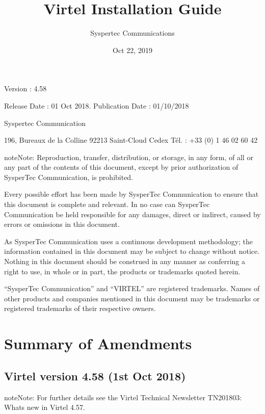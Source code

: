 \documentclass[letterpaper,10pt,english]{sphinxmanual}
\title{Virtel Installation Guide}
\date{Oct 22, 2019}
\author{Syspertec Communications}
\begin{document}
\pagestyle{empty}
\sphinxmaketitle
\pagestyle{plain}
\sphinxtableofcontents
\pagestyle{normal}
\label{\detokenize{Installation_Guide::doc}}




Version : 4.58

Release Date : 01 Oct 2018. Publication Date : 01/10/2018

Syspertec Communication

196, Bureaux de la Colline 92213 Saint-Cloud Cedex Tél. : +33 (0) 1 46 02 60 42


\begin{sphinxadmonition}{note}{Note:}
Reproduction, transfer, distribution, or storage, in any form, of all or any part of
the contents of this document, except by prior authorization of SysperTec
Communication, is prohibited.

Every possible effort has been made by SysperTec Communication to ensure that this document
is complete and relevant. In no case can SysperTec Communication be held responsible for
any damages, direct or indirect, caused by errors or omissions in this document.

As SysperTec Communication uses a continuous development methodology; the information
contained in this document may be subject to change without notice. Nothing in this
document should be construed in any manner as conferring a right to use, in whole or in
part, the products or trademarks quoted herein.

“SysperTec Communication” and “VIRTEL” are registered trademarks. Names of other products
and companies mentioned in this document may be trademarks or registered trademarks of
their respective owners.
\end{sphinxadmonition}

\newpage


\chapter{Summary of Amendments}
\label{\detokenize{Installation_Guide:summary-of-amendments}}\label{\detokenize{Installation_Guide:vvrrig58-summary-of-ammendments}}

\section{Virtel version 4.58 (1st Oct 2018)}
\label{\detokenize{Installation_Guide:virtel-version-4-58-1st-oct-2018}}
\begin{sphinxadmonition}{note}{Note:}
For further details see the Virtel Technical Newsletter TN201803: Whats new in Virtel 4.57.
\end{sphinxadmonition}
\end{document}
